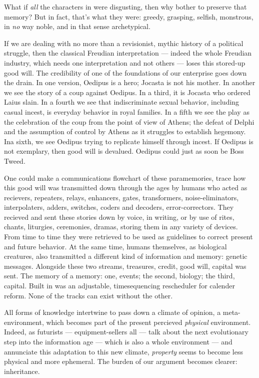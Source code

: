 What if \emph{all} the characters in  were disgusting, then why bother to preserve that memory? But in fact, that's what they were: greedy, grasping, selfish, monstrous, in \emph{no} way noble, and in that sense archetypical.

If we are dealing with no more than a revisionist, mythic history of a political struggle, then the classical Freudian interpretation --- indeed the whole Freudian industry, which needs one interpretation and not others --- loses this stored-up good will. The credibility of one of the foundations of our enterprise goes down the drain. In one version, Oedipus is a hero; Jocasta is not his mother. In another we see the story of a coup against Oedipus. In a third, it is Jocasta who ordered Laius slain. In a fourth we see that indiscriminate sexual behavior, including casual incest, is everyday behavior in royal families. In a fifth we see the play as the celebration of the coup from the point of view of Athens; the defeat of Delphi and the assumption of control by Athens as it struggles to establish hegemony. Ina sixth, we see Oedipus trying to replicate himself through incest. If Oedipus is not exemplary, then good will is devalued. Oedipus could just as soon be Boss Tweed.

One could make a communications flowchart of these paramemories, trace how this good will was transmitted down through the ages by humans who acted as recievers, repeaters, relays, enhancers, gates, transformers, noise-eliminators, interpolaters, adders, switches, coders and decoders, error-correctors. They recieved and sent these stories down by voice, in writing, or by use of rites, chants, liturgies, ceremonies, dramas, storing them in any variety of devices. From time to time they were retrieved to be used as guidelines to correct present and future behavior. At the same time, humans themselves, as biological creatures, also transmitted a different kind of information and memory: genetic messages. Alongside these two streams, treasures, credit, good will, capital was sent. The memory of a memory: one, events; the second, biology; the third, capital. Built in was an adjustable, timesequencing rescheduler for calender reform. None of the tracks can exist without the other.

All forms of knowledge intertwine to pass down a climate of opinion, a meta-environment, which becomes part of the present percieved \emph{physical} environment. Indeed, as futurists --- equipment-sellers all --- talk about the next evolutionary step into the information age --- which is also a whole environment --- and annunciate this adaptation to this new climate, \emph{property} seems to become less physical and more ephemeral. The burden of our argument becomes clearer: inheritance.

